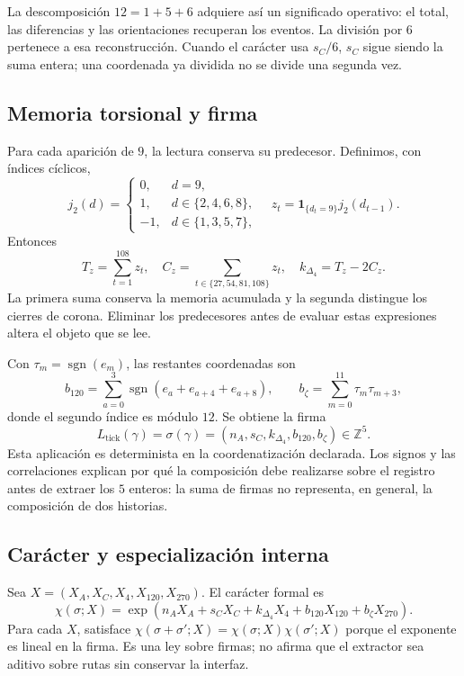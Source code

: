 La descomposición \(12=1+5+6\) adquiere así un significado operativo:
el total, las diferencias y las orientaciones recuperan los eventos.
La división por \(6\) pertenece a esa reconstrucción. Cuando el carácter
usa \(s_C/6\), \(s_C\) sigue siendo la suma entera; una coordenada ya
dividida no se divide una segunda vez.

\subsection{Memoria torsional y firma}

Para cada aparición de \(9\), la lectura conserva su predecesor.
Definimos, con índices cíclicos,
\[
 j_2(d)=\begin{cases}0,&d=9,\\1,&d\in\{2,4,6,8\},\\-1,&d\in\{1,3,5,7\},\end{cases}
 \quad z_t=\mathbf1_{\{d_t=9\}}j_2(d_{t-1}).
\]
Entonces
\[
 T_z=\sum_{t=1}^{108}z_t,\quad
 C_z=\sum_{t\in\{27,54,81,108\}}z_t,\quad
 k_{\Delta_4}=T_z-2C_z.
\]
La primera suma conserva la memoria acumulada y la segunda distingue los
cierres de corona. Eliminar los predecesores antes de evaluar estas
expresiones altera el objeto que se lee.

Con \(\tau_m=\operatorname{sgn}(e_m)\), las restantes coordenadas son
\[
 b_{120}=\sum_{a=0}^{3}\operatorname{sgn}(e_a+e_{a+4}+e_{a+8}),
 \qquad b_{\zeta}=\sum_{m=0}^{11}\tau_m\tau_{m+3},
\]
donde el segundo índice es módulo \(12\). Se obtiene la firma
\[
 L_{\mathrm{tick}}(\gamma)
 =\sigma(\gamma)=(n_A,s_C,k_{\Delta_4},b_{120},b_{\zeta})\in\mathbb Z^5.
\]
Esta aplicación es determinista en la coordenatización declarada. Los signos y las
correlaciones explican por qué la composición debe realizarse sobre el
registro antes de extraer los \(5\) enteros: la suma de firmas no
representa, en general, la composición de dos historias.

\subsection{Carácter y especialización interna}

Sea \(X=(X_A,X_C,X_4,X_{120},X_{270})\). El carácter formal es
\[
 \chi(\sigma;X)=\exp\!\left(n_AX_A+s_CX_C+k_{\Delta_4}X_4+
 b_{120}X_{120}+b_{\zeta}X_{270}\right).
\]
Para cada \(X\), satisface
\(\chi(\sigma+\sigma';X)=\chi(\sigma;X)\chi(\sigma';X)\)
porque el exponente es lineal en la firma. Es una ley sobre firmas; no
afirma que el extractor sea aditivo sobre rutas sin conservar la interfaz.

